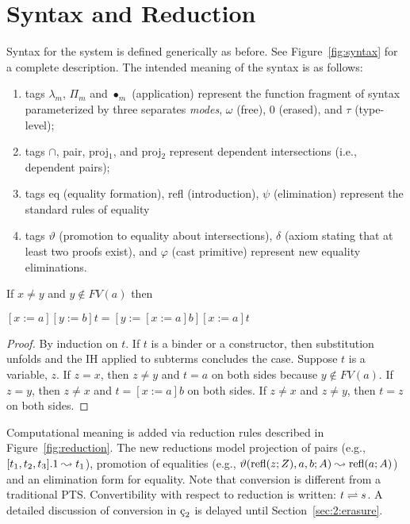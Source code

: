 \section{Syntax and Reduction}




Syntax for the system is defined generically as before.
See Figure~\ref{fig:syntax} for a complete description.
The intended meaning of the syntax is as follows:
\begin{enumerate}
    \item tags $\lambda_m$, $\Pi_m$ and $\bullet_m$ (application) represent the function fragment of syntax parameterized by three separates \textit{modes}, $\omega$ (free), $0$ (erased), and $\tau$ (type-level);
    \item tags $\cap$, pair, proj$_1$, and proj$_2$ represent dependent intersections (i.e., dependent pairs);
    \item tags eq (equality formation), refl (introduction), $\psi$ (elimination) represent the standard rules of equality
    \item tags $\vartheta$ (promotion to equality about intersections), $\delta$ (axiom stating that at least two proofs exist), and $\varphi$ (cast primitive) represent new equality eliminations.
\end{enumerate}

\begin{lemma}
    If $x \neq y$ and $y \notin FV(a)$ then \begin{tightcenter} $[x := a][y := b]t = [y := [x := a]b][x := a]t$ \end{tightcenter}
    \label{lem:2:subst_commute}
\end{lemma}
\begin{proof}
    By induction on $t$.
    If $t$ is a binder or a constructor, then substitution unfolds and the IH applied to subterms concludes the case.
    Suppose $t$ is a variable, $z$.
    If $z = x$, then $z \neq y$ and $t = a$ on both sides because $y \notin FV(a)$.
    If $z = y$, then $z \neq x$ and $t = [x := a]b$ on both sides.
    If $z \neq x$ and $z \neq y$, then $t = z$ on both sides.
\end{proof}

Computational meaning is added via reduction rules described in Figure~\ref{fig:reduction}.
The new reductions model projection of pairs (e.g., $[t_1, t_2, t_3].1 \leadsto t_1$), promotion of equalities (e.g., $\vartheta(\text{refl}(z; Z), a, b; A) \leadsto \text{refl}(a; A)$) and an elimination form for equality.
Note that conversion is different from a traditional PTS.
Convertibility with respect to reduction is written: $t \rightleftharpoons s$.
A detailed discussion of conversion in $\ced$ is delayed until Section~\ref{sec:2:erasure}.

